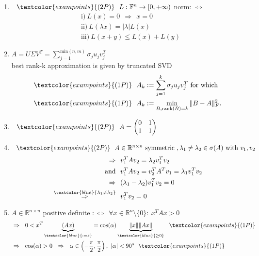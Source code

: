{\color{solution}
\begin{enumerate}
	\item $~~\textcolor{exampoints}{(2P)}~~L:\mathbb{F}^n\rightarrow[0,+\infty)$ norm: $\Leftrightarrow$
	\begin{align*}
	&\text{i)}~L(x)=0~~\Rightarrow~~x=0\\
	&\text{ii)}~L(\lambda x)=|\lambda|L(x)\\
	&\text{iii)}~L(x+y)\leq L(x)+L(y)
	\end{align*}
	
	\item 
	$A=U\Sigma V^T=\sum_{j=1}^{\text{min}(n,m)}\sigma_ju_jv_j^T$\\
	best rank-k approximation is given by truncated SVD
	\begin{align*}
	&\textcolor{exampoints}{(1P)}~~A_k:=\sum_{j=1}^{k}\sigma_ju_jv_j^T~\text{for which}\\
	&\textcolor{exampoints}{(1P)}~~A_k:=\min_{B,\text{rank}(B)=k}\|B-A\|_F^2.
	\end{align*}
	
	\item $~~\textcolor{exampoints}{(2P)}~~A=\begin{pmatrix}0&1\\1&1\end{pmatrix}$
	
	\item $~~\textcolor{exampoints}{(2P)}~~A\in\mathbb{R}^{n\times n}~\text{symmetric}~, \lambda_1\neq\lambda_2\in\sigma(A)~\text{with}~v_1, v_2$
	\begin{align*}
	\Rightarrow~~&v_1^TAv_2=\lambda_2v_1^Tv_2\\
	\text{and}~~&v_1^TAv_2=v_2^TA^Tv_1=\lambda_1v_1^Tv_2\\
	\Rightarrow~~&(\lambda_1-\lambda_2)v_1^Tv_2=0\\
	\stackrel{\textcolor{blue}{\lambda_1\neq\lambda_2}}{\Rightarrow}~~&v_1^Tv_2=0
	\end{align*}
	
	\item 
	$A\in\mathbb{R}^{n\times n}$ positive definite $:\Leftrightarrow~~\forall x\in\mathbb{R}^n\setminus\{0\}:~x^TAx>0$
	\begin{align*}
	&\Rightarrow~~0<x^T\underbrace{(Ax)}_{\textcolor{blue}{:=z}}=\text{cos}(\alpha)\underbrace{\|x\|\|Ax\|}_{\textcolor{blue}{\geq 0}}~~\textcolor{exampoints}{(1P)}\\
	&\Rightarrow~~\text{cos}(\alpha)>0~~\Rightarrow~~\alpha\in\left(-\frac{\pi}{2},\frac{\pi}{2}\right),~|\alpha|<90^{\text{o}}~~\textcolor{exampoints}{(1P)}
	\end{align*}
\end{enumerate}
}